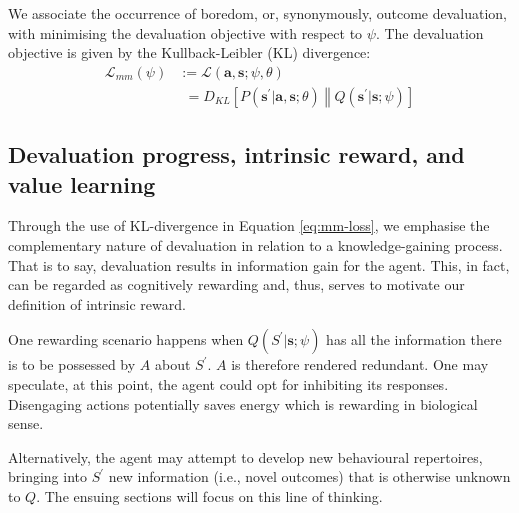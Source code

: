 \documentclass[utf8]{frontiersSCNS}
\newcommand{\bs}{\boldsymbol}
\begin{document}
We associate the occurrence of boredom, or, synonymously, outcome devaluation, with minimising the devaluation objective with respect to $\psi$. The devaluation objective is given by the Kullback-Leibler (KL) divergence:
%
	\begin{equation}
	\begin{aligned} \label{eq:mm-loss}
	\mathcal{L}_{mm}(\psi) &:=
	\mathcal{L}(\bs{a}, \bs{s}; \psi, \theta) \\
		&\phantom{:}= 
		D_{KL}\left[ P(\bs{s}^\prime|\bs{a}, \bs{s}; \theta) 
		\middle\Vert 
		Q(\bs{s}^\prime|\bs{s}; \psi) \right]
	\end{aligned}
	\end{equation}
%

\subsection{Devaluation progress, intrinsic reward, and value learning}

Through the use of KL-divergence in Equation \ref{eq:mm-loss}, we emphasise the complementary nature of devaluation in relation to a knowledge-gaining process. That is to say, devaluation results in information gain for the agent. This, in fact, can be regarded as cognitively rewarding and, thus, serves to motivate our definition of intrinsic reward. 

One rewarding scenario happens when $Q(S^\prime|\bs{s}; \psi)$ has all the information there is to be possessed by $A$ about $S^\prime$. $A$ is therefore rendered redundant. One may speculate, at this point, the agent could opt for inhibiting its responses. Disengaging actions potentially saves energy which is rewarding in biological sense. 

Alternatively, the agent may attempt to develop new behavioural repertoires, bringing into $S^\prime$ new information (i.e., novel outcomes) that is otherwise unknown to $Q$. The ensuing sections will focus on this line of thinking.
\end{document}
